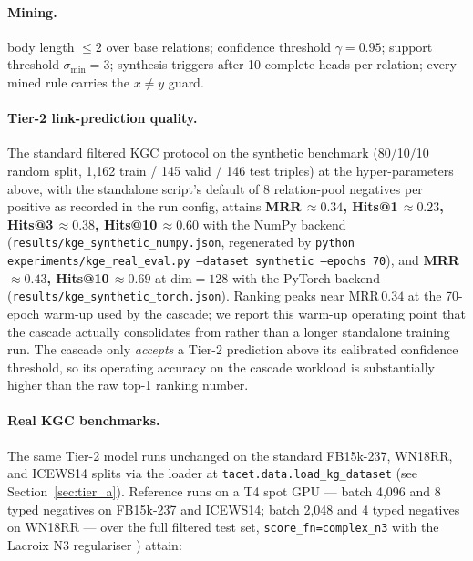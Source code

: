 \documentclass[11pt]{article}
\theoremstyle{plain}
\begin{document}
\paragraph{Mining.} body length $\le 2$ over base relations; confidence
threshold $\gamma=0.95$; support threshold $\sigma_{\mathrm{min}}=3$; synthesis triggers
after 10 complete heads per relation; every mined rule carries the
$x\neq y$ guard.

\paragraph{Tier-2 link-prediction quality.} The standard filtered KGC
protocol on the synthetic benchmark (80/10/10 random split, 1{,}162 train /
145 valid / 146 test triples) at the hyper-parameters above, with the
standalone script's default of $8$ relation-pool negatives per positive as
recorded in the run config, attains
\textbf{MRR\,$\approx 0.34$, Hits@1\,$\approx 0.23$, Hits@3\,$\approx 0.38$,
Hits@10\,$\approx 0.60$} with the NumPy backend
(\texttt{results/kge\_synthetic\_numpy.json}, regenerated by
\texttt{python experiments/kge\_real\_eval.py --dataset synthetic --epochs 70}),
and \textbf{MRR\,$\approx 0.43$, Hits@10\,$\approx 0.69$} at $\mathrm{dim}=128$
with the PyTorch backend (\texttt{results/kge\_synthetic\_torch.json}).
Ranking peaks near MRR\,$0.34$ at the 70-epoch warm-up used by the cascade; we
report this warm-up operating point that the cascade actually consolidates from
rather than a longer standalone training run.
The cascade only \emph{accepts} a Tier-2 prediction above its calibrated
confidence threshold, so its operating accuracy on the cascade workload is
substantially higher than the raw top-1 ranking number.

\paragraph{Real KGC benchmarks.}
The same Tier-2 model runs unchanged on the standard FB15k-237,
WN18RR, and ICEWS14 splits via the loader at
\texttt{tacet.data.load\_kg\_dataset} (see
Section~\ref{sec:tier_a}).  Reference runs on a T4 spot GPU
--- batch 4{,}096 and 8 typed negatives on FB15k-237 and ICEWS14;
batch 2{,}048 and 4 typed negatives on WN18RR --- over the full filtered
test set, \texttt{score\_fn=complex\_n3} with the Lacroix N3 regulariser
\cite{lacroix2018complex_n3}) attain:
\end{document}
